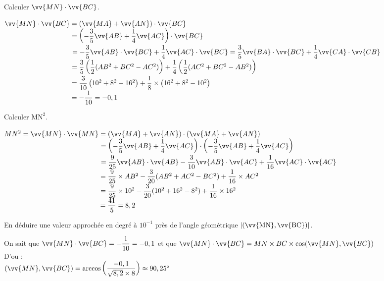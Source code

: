 \documentclass[12pt,a4paper]{book}
\begin{document}
\begin{enumMet}
    \item Calculer $\vv{MN} \cdot \vv{BC}$.
    \begin{corrBox}
    	$\vv{MN} \cdot \vv{BC}=\left(\vv{MA}+\vv{AN}\right)\cdot\vv{BC}$\\
    	$\phantom{\vv{MN} \cdot \vv{BC}}=\left(-\dfrac{3}{5}\vv{AB}+\dfrac{1}{4}\vv{AC}\right)\cdot\vv{BC}$\\
    	$\phantom{\vv{MN} \cdot \vv{BC}}=-\dfrac{3}{5}\vv{AB}\cdot\vv{BC}+\dfrac{1}{4}\vv{AC}\cdot\vv{BC}=\dfrac{3}{5}\vv{BA}\cdot\vv{BC}+\dfrac{1}{4}\vv{CA}\cdot\vv{CB}$\\
    	$\phantom{\vv{MN} \cdot \vv{BC}}=\dfrac{3}{5}\left(\dfrac{1}{2}(AB^2+BC^2-AC^2)\right)+\dfrac{1}{4}\left(\dfrac{1}{2}(AC^2+BC^2-AB^2)\right)$\\
    	$\phantom{\vv{MN} \cdot \vv{BC}}=\dfrac{3}{10}\left(10^2+8^2-16^2\right)+\dfrac{1}{8}\times \left(16^2+8^2-10^2\right)$\\
    	$\phantom{\vv{MN} \cdot \vv{BC}}=-\dfrac{1}{10}=-0,1$	
    \end{corrBox}
    \item Calculer $\mathrm{MN}^2$.
    \begin{corrBox}
    	$MN^2=\vv{MN} \cdot \vv{MN}=\left(\vv{MA}+\vv{AN}\right)\cdot\left(\vv{MA}+\vv{AN}\right)$\\
    	$\phantom{MN^2=\vv{MN} \cdot \vv{MN}}=\left(-\dfrac{3}{5}\vv{AB}+\dfrac{1}{4}\vv{AC}\right)\cdot\left(-\dfrac{3}{5}\vv{AB}+\dfrac{1}{4}\vv{AC}\right)$\\
    	$\phantom{MN^2=\vv{MN} \cdot \vv{MN}}=\dfrac{9}{25}\vv{AB}\cdot\vv{A B}-\dfrac{3}{10}\vv{A B}\cdot\vv{AC}+\dfrac{1}{16}\vv{AC}\cdot\vv{AC}$\\
    	$\phantom{MN^2=\vv{MN} \cdot \vv{MN}}=\dfrac{9}{25}\times AB^2-\dfrac{3}{20}(AB^2+AC^2-BC^2)+\dfrac{1}{16}\times AC^2$\\
    	$\phantom{MN^2=\vv{MN} \cdot \vv{MN}}=\dfrac{9}{25}\times 10^2-\dfrac{3}{20}(10^2+16^2-8^2)+\dfrac{1}{16}\times 16^2$\\
    	$\phantom{MN^2=\vv{MN} \cdot \vv{MN}}=\dfrac{41}{5}=8,2$
    			
    \end{corrBox}
    \item En déduire une valeur approchée en degré à $10^{-1}$ près de l'angle géométrique $|(\vv{\mathrm{MN}}, \vv{\mathrm{BC}})|$.
    \begin{corrBox}
    	On sait que $\vv{MN} \cdot \vv{BC}=-\dfrac{1}{10}=-0,1$ et que $\vv{MN} \cdot \vv{BC}=MN\times BC\times \cos(\vv{MN}, \vv{BC})$\\
    	D'ou : \\
    	$(\vv{MN}, \vv{BC})=\arccos\left(\dfrac{-0,1}{\sqrt{8,2}\times 8}\right)\approx90,25\degree$
    \end{corrBox}
\end{enumMet}
\end{document}
